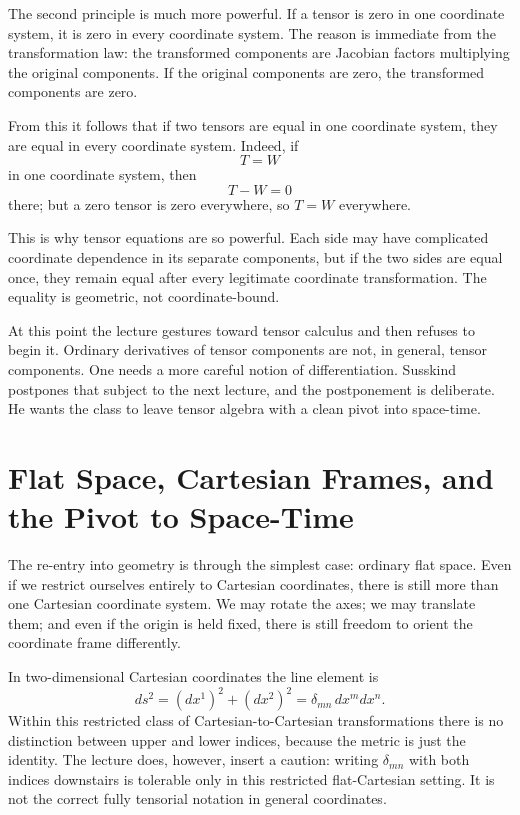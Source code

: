 The second principle is much more powerful. If a tensor is zero in one coordinate system, it is zero in every coordinate system. The reason is immediate from the transformation law: the transformed components are Jacobian factors multiplying the original components. If the original components are zero, the transformed components are zero.

From this it follows that if two tensors are equal in one coordinate system, they are equal in every coordinate system. Indeed, if
\[
T=W
\]
in one coordinate system, then
\[
T-W=0
\]
there; but a zero tensor is zero everywhere, so \(T=W\) everywhere.

This is why tensor equations are so powerful. Each side may have complicated coordinate dependence in its separate components, but if the two sides are equal once, they remain equal after every legitimate coordinate transformation. The equality is geometric, not coordinate-bound.

At this point the lecture gestures toward tensor calculus and then refuses to begin it. Ordinary derivatives of tensor components are not, in general, tensor components. One needs a more careful notion of differentiation. Susskind postpones that subject to the next lecture, and the postponement is deliberate. He wants the class to leave tensor algebra with a clean pivot into space-time.

\section{Flat Space, Cartesian Frames, and the Pivot to Space-Time}

The re-entry into geometry is through the simplest case: ordinary flat space. Even if we restrict ourselves entirely to Cartesian coordinates, there is still more than one Cartesian coordinate system. We may rotate the axes; we may translate them; and even if the origin is held fixed, there is still freedom to orient the coordinate frame differently.

In two-dimensional Cartesian coordinates the line element is
\begin{equation}
ds^2=(dx^1)^2+(dx^2)^2=\delta_{mn}\,dx^m dx^n.
\end{equation}
Within this restricted class of Cartesian-to-Cartesian transformations there is no distinction between upper and lower indices, because the metric is just the identity. The lecture does, however, insert a caution: writing \(\delta_{mn}\) with both indices downstairs is tolerable only in this restricted flat-Cartesian setting. It is not the correct fully tensorial notation in general coordinates.

